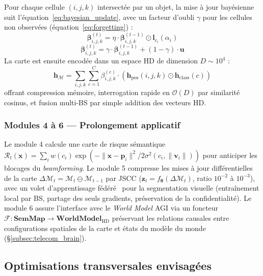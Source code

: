 \documentclass[12pt,a4paper,titlepage]{article}
\begin{document}
Pour chaque cellule $(i,j,k)$ intersectée par un objet, la mise à jour bayésienne suit l'équation~\eqref{eq:bayesian_update}, avec un facteur d'oubli $\gamma$ pour les cellules non observées (équation~\eqref{eq:forgetting}) :
\begin{equation}
    \boldsymbol{\beta}_{i,j,k}^{(t)} = \eta \cdot \boldsymbol{\beta}_{i,j,k}^{(t-1)} \odot \mathbf{l}_{c_i}(\alpha_i)
    \label{eq:bayesian_update}
\end{equation}
\begin{equation}
    \boldsymbol{\beta}_{i,j,k}^{(t)} = \gamma \cdot \boldsymbol{\beta}_{i,j,k}^{(t-1)} + (1-\gamma) \cdot \mathbf{u}
    \label{eq:forgetting}
\end{equation}
La carte est ensuite encodée dans un espace HD de dimension $D\sim10^4$ :
\begin{equation}
    \mathbf{h}_{\mathcal{M}} = \sum_{i,j,k} \sum_{c=1}^{C} \beta_{i,j,k}^{(c)} \cdot \left( \mathbf{h}_{\text{pos}}(i,j,k) \odot \mathbf{h}_{\text{class}}(c) \right)
    \label{eq:hd_encoding}
\end{equation}
offrant compression mémoire, interrogation rapide en $\mathcal{O}(D)$ par similarité cosinus, et fusion multi-BS par simple addition des vecteurs HD.

\subsubsection{Modules 4 à 6 --- Prolongement applicatif}

Le module 4 calcule une carte de risque sémantique $\mathcal{R}_t(\mathbf{x}) = \sum_i w(c_i)\exp(-\|\mathbf{x}-\mathbf{p}_i\|^2 / 2\sigma^2(c_i,\|\mathbf{v}_i\|))$ pour anticiper les blocages du \textit{beamforming}. Le module 5 compresse les mises à jour différentielles de la carte $\Delta\mathcal{M}_t = \mathcal{M}_t \ominus \mathcal{M}_{t-1}$ par JSCC ($\mathbf{z}_t = f_{\boldsymbol{\theta}}(\Delta\mathcal{M}_t)$, ratio $10^{-2}$ à $10^{-3}$), avec un volet d'apprentissage fédéré~\cite{federated_learning} pour la segmentation visuelle (entraînement local par BS, partage des seuls gradients, préservation de la confidentialité). Le module 6 assure l'interface avec le \textit{World Model} AGI via un foncteur $\mathcal{F}: \mathbf{SemMap} \to \mathbf{WorldModel}_{\text{HD}}$ préservant les relations causales entre configurations spatiales de la carte et états du modèle du monde (\S\ref{subsec:telecom_brain}).

\subsection{Optimisations transversales envisagées}
\end{document}
